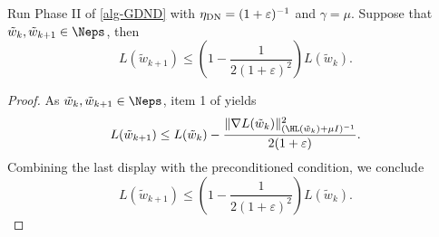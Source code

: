 \begin{lemma}
\label{lemma:local_descent}
    Run Phase II of \cref{alg-GDND} with $\eta_{\textup{DN}} = (1+\varepsilon)^{-1}$ and $\gamma = \mu$. 
    Suppose that $\tilde w_{k}, \tilde w_{k+1}\in \Neps$, then
    \[
     L(\tilde w_{k+1})\leq \left(1-\frac{1}{2(1+\varepsilon)^2}\right)L(\tilde w_k).
    \]
\end{lemma}
\begin{proof}
    As $\tilde w_k, \tilde w_{k+1}\in \Neps$, item 1 of  yields
    \[
    L(\tilde w_{k+1})\leq L(\tilde w_k)-\frac{\|\nabla L(\tilde w_k)\|^2_{(\HL(\tilde w_k)+\mu I)^{-1}}}{2(1+\varepsilon)}.
    \]
    Combining the last display with the preconditioned \PL condition, 
    we conclude
    \[
    L(\tilde w_{k+1})\leq \left(1-\frac{1}{2(1+\varepsilon)^2}\right)L(\tilde w_k).
    \]
\end{proof}

